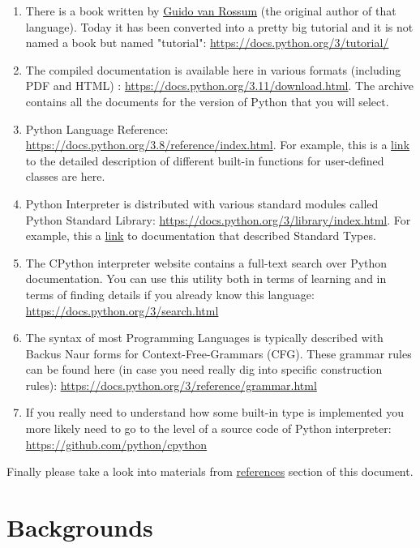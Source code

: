 \documentclass[
]{article}
\begin{document}
\begin{enumerate}
\def\labelenumi{\arabic{enumi}.}
\item
  There is a book written by
  \href{https://en.wikipedia.org/wiki/Guido_van_Rossum}{Guido van
  Rossum} (the original author of that language). Today it has been
  converted into a pretty big tutorial and it is not named a book but
  named "tutorial": \url{https://docs.python.org/3/tutorial/}
\item
  The compiled documentation is available here in various formats
  (including PDF and HTML) :
  \url{https://docs.python.org/3.11/download.html}. The archive contains
  all the documents for the version of Python that you will select.
\item
  Python Language Reference:
  \url{https://docs.python.org/3.8/reference/index.html}. For example,
  this is a
  \href{https://docs.python.org/3/reference/datamodel.html\#emulating-callable-objects}{link}
  to the detailed description of different built-in functions for
  user-defined classes are here.
\item
  Python Interpreter is distributed with various standard modules called
  Python Standard Library:
  \url{https://docs.python.org/3/library/index.html}. For example, this
  a \href{https://docs.python.org/3/library/stdtypes.html}{link} to
  documentation that described Standard Types.
\item
  The CPython interpreter website contains a full-text search over
  Python documentation. You can use this utility both in terms of
  learning and in terms of finding details if you already know this
  language: \url{https://docs.python.org/3/search.html}
\item
  The syntax of most Programming Languages is typically described with
  Backus Naur forms for Context-Free-Grammars (CFG). These grammar rules
  can be found here (in case you need really dig into specific
  construction rules):
  \url{https://docs.python.org/3/reference/grammar.html}
\item
  If you really need to understand how some built-in type is implemented
  you more likely need to go to the level of a source code of Python
  interpreter: \url{https://github.com/python/cpython}
\end{enumerate}

Finally please take a look into materials from
\protect\hyperlink{references}{references} section of this document.

\hypertarget{backgrounds}{%
\section{Backgrounds}\label{backgrounds}}
\end{document}

